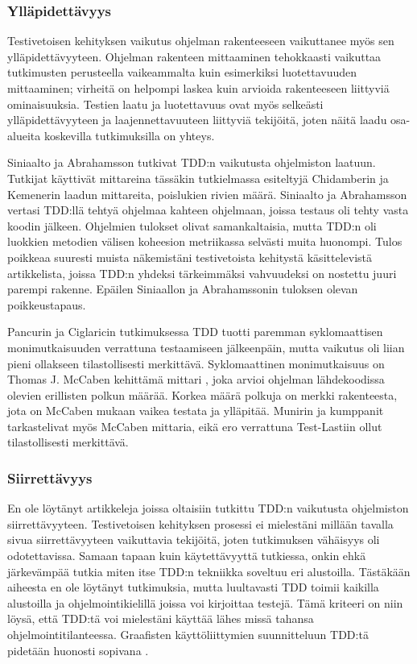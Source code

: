 \documentclass[finnish]{tktltiki2}
\theoremstyle{definition}
\theoremstyle{remark}
\begin{document}
\subsubsection{Ylläpidettävyys}

Testivetoisen kehityksen vaikutus ohjelman rakenteeseen vaikuttanee myös sen ylläpidettävyyteen. Ohjelman rakenteen mittaaminen tehokkaasti vaikuttaa tutkimusten perusteella vaikeammalta kuin esimerkiksi luotettavuuden mittaaminen; virheitä on helpompi laskea kuin arvioida rakenteeseen liittyviä ominaisuuksia. Testien laatu ja luotettavuus ovat myös selkeästi ylläpidettävyyteen ja laajennettavuuteen liittyviä tekijöitä, joten näitä laadu osa-alueita koskevilla tutkimuksilla on yhteys.

Siniaalto ja Abrahamsson \cite{Siniaalto07} tutkivat TDD:n vaikutusta ohjelmiston laatuun. Tutkijat käyttivät mittareina tässäkin tutkielmassa esiteltyjä Chidamberin ja Kemenerin laadun mittareita, poislukien rivien määrä. Siniaalto ja Abrahamsson vertasi TDD:llä tehtyä ohjelmaa kahteen ohjelmaan, joissa testaus oli tehty vasta koodin jälkeen. Ohjelmien tulokset olivat samankaltaisia, mutta TDD:n oli luokkien metodien välisen koheesion metriikassa selvästi muita huonompi. Tulos poikkeaa suuresti muista näkemistäni testivetoista kehitystä käsittelevistä artikkelista, joissa TDD:n yhdeksi tärkeimmäksi vahvuudeksi on nostettu juuri parempi rakenne. Epäilen Siniaallon ja Abrahamssonin tuloksen olevan poikkeustapaus.

Pancurin ja Ciglaricin tutkimuksessa \cite{Pancur11} TDD tuotti paremman syklomaattisen monimutkaisuuden verrattuna testaamiseen jälkeenpäin, mutta vaikutus oli liian pieni ollakseen tilastollisesti merkittävä. Syklomaattinen monimutkaisuus on Thomas J. McCaben kehittämä mittari \cite{McCabe76}, joka arvioi ohjelman lähdekoodissa olevien erillisten polkun määrää. Korkea määrä polkuja on merkki rakenteesta, jota on McCaben mukaan vaikea testata ja ylläpitää. Munirin ja kumppanit \cite{Munir14} tarkastelivat myös McCaben mittaria, eikä ero verrattuna Test-Lastiin ollut tilastollisesti merkittävä.

\subsubsection{Siirrettävyys}

En ole löytänyt artikkeleja joissa oltaisiin tutkittu TDD:n vaikutusta ohjelmiston siirrettävyyteen. Testivetoisen kehityksen prosessi ei mielestäni millään tavalla sivua siirrettävyyteen vaikuttavia tekijöitä, joten tutkimuksen vähäisyys oli odotettavissa.
Samaan tapaan kuin käytettävyyttä tutkiessa, onkin ehkä järkevämpää tutkia miten itse TDD:n tekniikka soveltuu eri alustoilla. Tästäkään aiheesta en ole löytänyt tutkimuksia, mutta luultavasti TDD toimii kaikilla alustoilla ja ohjelmointikielillä joissa voi kirjoittaa testejä. Tämä kriteeri on niin löysä, että TDD:tä voi mielestäni käyttää lähes missä tahansa ohjelmointitilanteessa. Graafisten käyttöliittymien suunnitteluun TDD:tä pidetään huonosti sopivana \cite{Hellman10}.
\end{document}
